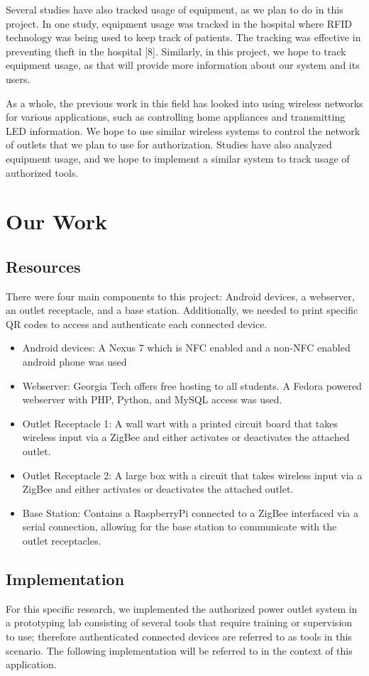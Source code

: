 \documentclass{sigchi}
\begin{document}
Several studies have also tracked usage of equipment, as we plan to do in this project. In one study, equipment usage was tracked in the hospital where RFID technology was being used to keep track of patients. The tracking was effective in preventing theft in the hospital [8]. Similarly, in this project, we hope to track equipment usage, as that will provide more information about our system and its users.

As a whole, the previous work in this field has looked into using wireless networks for various applications, such as controlling home appliances and transmitting LED information. We hope to use similar wireless systems to control the network of outlets that we plan to use for authorization. Studies have also analyzed equipment usage, and we hope to implement a similar system to track usage of authorized tools.

\section{Our Work}

\subsection {Resources}
There were four main components to this project:  Android devices, a webserver,  an outlet receptacle, and a base station. Additionally, we needed to print specific QR codes to access and authenticate each connected device.
\begin{itemize}
\item Android devices: A Nexus 7 which is NFC enabled and a non-NFC enabled android phone was used
\item Webserver: Georgia Tech offers free hosting to all students. A Fedora powered webserver with PHP, Python, and MySQL access was used.
\item Outlet Receptacle 1: A wall wart with a printed circuit board that takes wireless input via a ZigBee and either activates or deactivates the attached outlet. 
\item Outlet Receptacle 2: A large box with a circuit that takes wireless input via a ZigBee and either activates or deactivates the attached outlet. 
\item Base Station: Contains a RaspberryPi connected to a ZigBee interfaced via a serial connection, allowing for the base station to communicate with the outlet receptacles.
\end{itemize}
\subsection{Implementation}
For this specific research, we implemented the authorized power outlet system in a prototyping lab consisting of several tools that require training or supervision to use; therefore authenticated connected devices are referred to as tools in this scenario. The following implementation will be referred to in the context of this application.
\end{document}
